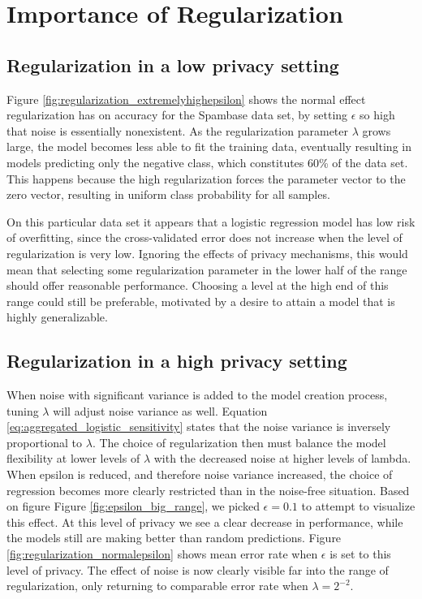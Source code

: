 \section{Importance of Regularization}

\subsection{Regularization in a low privacy setting}
Figure \ref{fig:regularization_extremelyhighepsilon} shows the normal effect regularization has on accuracy for the Spambase data set, by setting $\epsilon$ so high that noise is essentially nonexistent. As the regularization parameter $\lambda$ grows large, the model becomes less able to fit the training data, eventually resulting in models predicting only the negative class, which constitutes 60\% of the data set. This happens because the high regularization forces the parameter vector to the zero vector, resulting in uniform class probability for all samples. 

On this particular data set it appears that a logistic regression model has low risk of overfitting, since the cross-validated error does not increase when the level of regularization is very low. Ignoring the effects of privacy mechanisms, this would mean that selecting some regularization parameter in the lower half of the range should offer reasonable performance. Choosing a level at the high end of this range could still be preferable, motivated by a desire to attain a model that is highly generalizable.

\subsection{Regularization in a high privacy setting}

When noise with significant variance is added to the model creation process, tuning $\lambda$ will adjust noise variance as well. Equation \ref{eq:aggregated_logistic_sensitivity} states that the noise variance is inversely proportional to $\lambda$. The choice of regularization then must balance the model flexibility at lower levels of $\lambda$ with the decreased noise at higher levels of lambda. When epsilon is reduced, and therefore noise variance increased, the choice of regression becomes more clearly restricted than in the noise-free situation. Based on figure Figure \ref{fig:epsilon_big_range}, we picked $\epsilon = 0.1$ to attempt to visualize this effect. At this level of privacy we see a clear decrease in performance, while the models still are making better than random predictions. Figure \ref{fig:regularization_normalepsilon} shows mean error rate when $\epsilon$ is set to this level of privacy. The effect of noise is now clearly visible far into the range of regularization, only returning to comparable error rate when $\lambda = 2^{-2}$. 

